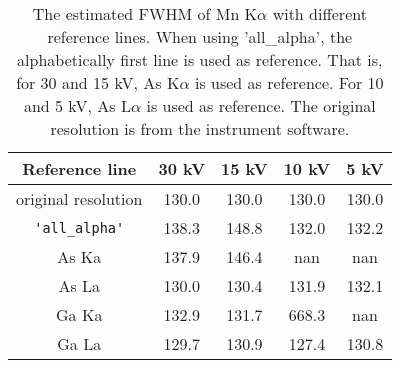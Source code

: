 



\begin{table}[p]
    \centering
    \caption{
        The estimated FWHM of Mn K$\alpha$ with different reference lines.
        When using 'all\_alpha', the alphabetically first line is used as reference.
        That is, for 30 and 15 kV, As K$\alpha$ is used as reference.
        For 10 and 5 kV, As L$\alpha$ is used as reference.
        The original resolution is from the instrument software.
    }
    \label{tab:results:estimated-FWHM}
    \begin{tabular}{ccccc}
        Reference line      & 30 kV & 15 kV & 10 kV & 5 kV  \\
        \hline
        original resolution & 130.0 & 130.0 & 130.0 & 130.0 \\
        \verb|'all_alpha'|  & 138.3 & 148.8 & 132.0 & 132.2 \\
        As Ka               & 137.9 & 146.4 & nan   & nan   \\
        As La               & 130.0 & 130.4 & 131.9 & 132.1 \\
        Ga Ka               & 132.9 & 131.7 & 668.3 & nan   \\
        Ga La               & 129.7 & 130.9 & 127.4 & 130.8
    \end{tabular}
\end{table}